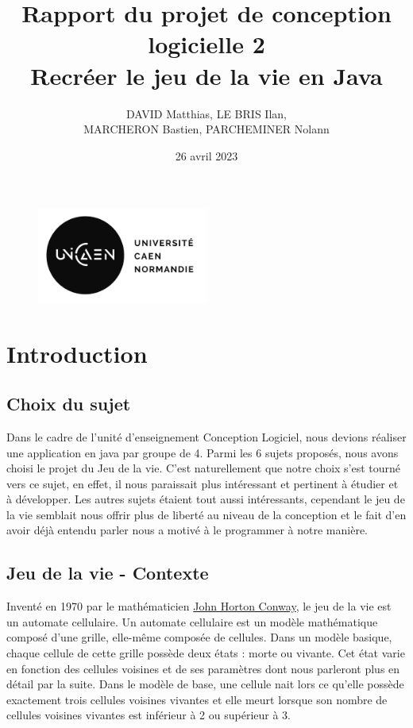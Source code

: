 \documentclass[12pt]{article}
\title{%
	Rapport du projet de conception logicielle 2 \\
	\large Recréer le jeu de la vie en Java}
\author{DAVID Matthias, LE BRIS Ilan,\\ MARCHERON Bastien, PARCHEMINER Nolann}
\date{26 avril 2023}
\begin{document}
	\maketitle
	\begin{figure}[!h]
		\centering
		\includegraphics[width=0.5\textwidth]{images/logo_unicaen.png}
	\end{figure}
	\newpage
	
	\setcounter{tocdepth}{3}
	\tableofcontents
	\newpage
	
	\section{Introduction}
		\subsection{Choix du sujet}
			Dans le cadre de l’unité d’enseignement Conception Logiciel, nous devions réaliser une application en java par groupe de 4. Parmi les 6 sujets proposés, nous avons choisi le projet du Jeu de la vie. C’est naturellement que notre choix s’est tourné vers ce sujet, en effet, il nous paraissait plus intéressant et pertinent à étudier et à développer. Les autres sujets étaient tout aussi intéressants, cependant le jeu de la vie semblait nous offrir plus de liberté au niveau de la conception et le fait d’en avoir déjà entendu parler nous a motivé à le programmer à notre manière. 
			
		\subsection{Jeu de la vie - Contexte}
			Inventé en 1970 par le mathématicien \href{https://fr.wikipedia.org/wiki/John_Horton_Conway}{John Horton Conway}, le jeu de la vie est un automate cellulaire. Un automate cellulaire est un modèle mathématique composé d’une grille, elle-même composée de cellules. Dans un modèle basique, chaque cellule de cette grille possède deux états : morte ou vivante. Cet état varie en fonction des cellules voisines et de ses paramètres dont nous parleront plus en détail par la suite. Dans le modèle de base, une cellule nait lors ce qu’elle possède exactement trois cellules voisines vivantes et elle meurt lorsque son nombre de cellules voisines vivantes est inférieur à 2 ou supérieur à 3. 
			
\end{document}
